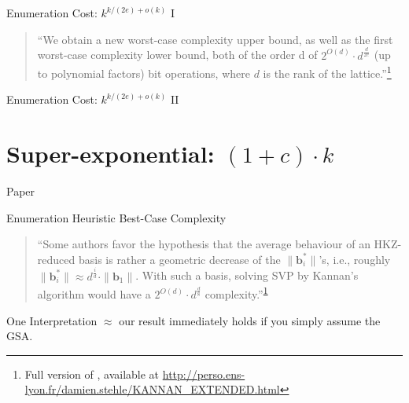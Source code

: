 \documentclass[xcolor=table,10pt,aspectratio=169]{beamer}
\renewcommand{\vec}[1]{\ensuremath{\mathbf{#1}}\xspace}
\begin{document}
\begin{frame}[label={sec:orgd2457ad}]{Enumeration Cost: \(k^{k/(2e) + o(k)}\) I}
\begin{quote}
“We obtain a new worst-case complexity upper bound, as well as the first worst-case complexity lower
bound, both of the order d of \(2^{O(d)} \cdot d^{\frac{d}{2e}}\) (up to polynomial factors) bit
operations, where \(d\) is the rank of the lattice.”\footnote{Full version of , available at \url{http://perso.ens-lyon.fr/damien.stehle/KANNAN\_EXTENDED.html}\label{orge03878f}}
\end{quote}
\end{frame}

\begin{frame}[label={sec:orgb875356}]{Enumeration Cost: \(k^{k/(2e) + o(k)}\) II}
\tikzset{external/export=true}
\tikzset{external/export=false}

\footnotesize {}
\end{frame}

\section{Super-exponential: \((1+ c)\cdot k\)}
\label{sec:org67d6309}
\begin{frame}[label={sec:org1e521cb}]{Paper}
\end{frame}

\begin{frame}[label={sec:org3ef24bc}]{Enumeration Heuristic Best-Case Complexity}
\begin{quote}
“Some authors favor the hypothesis that the average behaviour of an HKZ-reduced basis is rather a geometric decrease of the \(\|\vec{b}_i^{*}\|\)’s, i.e., roughly \(\|\vec{b}^*_i\| ≈ d^{\frac{i}{d}} \cdot \|\vec{b}_1\|\). With such a basis, solving SVP by Kannan’s algorithm would have a \(2^{O(d)} \cdot d^{\frac{d}{8}}\) complexity.”\textsuperscript{\ref{orge03878f}}
\end{quote}

\begin{alertblock}{One Interpretation}
\(\approx\) our result immediately holds if you simply assume the GSA.
\end{alertblock}
\end{frame}
\end{document}
